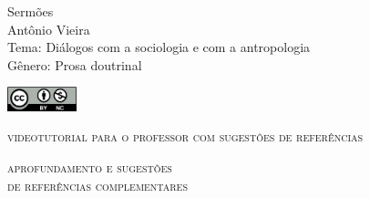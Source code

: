 \documentclass[smaller,professionalfonts,15pt]{beamer}
\begin{document}
										\begin{frame}\begin{raggedleft}
										\Huge 
Sermões						\\
										\huge 
Antônio Vieira							\\
										\bigskip
										\normalsize
Tema: Diálogos com a sociologia e com a antropologia		\\	
Gênero: Prosa doutrinal 			\\\vfill\hfill
\publishername
										\end{raggedleft}

\smallskip\includegraphics[width=2cm]{ccbync.png}\hfill
\end{frame}


\begin{frame}{\textsc{videotutorial para o professor com sugestões de referências}}
\vspace{-2cm}\begin{figure}
\end{figure}
\end{frame}



\begin{frame}
\hfill\Huge
\textsc{aprofundamento e sugestões\\\hfill de referências complementares}
\end{frame}
\end{document}
